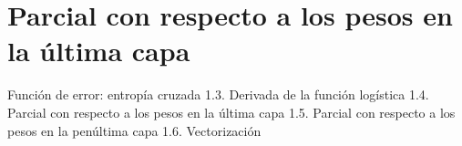 \section{Parcial con respecto a los pesos en la última capa}

Función de error: entropía cruzada
1.3. Derivada de la función logística
1.4. Parcial con respecto a los pesos en la última capa
1.5. Parcial con respecto a los pesos en la penúltima capa
1.6. Vectorización
